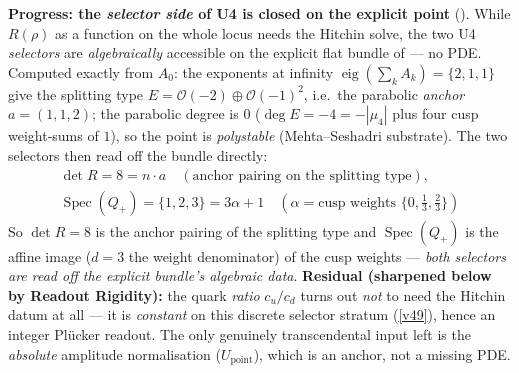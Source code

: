\documentclass[11pt,a4paper]{article}
\begin{document}
\par\smallskip\noindent\textbf{Progress: the \emph{selector side} of U4 is closed on the explicit point} (\mE).
While $R(\rho)$ as a function on the whole locus needs the Hitchin solve, the two U4 \emph{selectors} are
\emph{algebraically} accessible on the explicit flat bundle of  --- no
PDE. Computed exactly from $A_0$: the exponents at infinity $\operatorname{eig}(\sum_kA_k)=\{2,1,1\}$ give
the splitting type $E=\mathcal O(-2)\oplus\mathcal O(-1)^2$, i.e.\ the parabolic \emph{anchor} $a=(1,1,2)$;
the parabolic degree is $0$ ($\deg E=-4=-|\mu_4|$ plus four cusp weight-sums of $1$), so the point is
\emph{polystable} (Mehta--Seshadri substrate). The two selectors then read off the bundle directly:
\[
  \boxed{\ \begin{gathered}
  \det R=8=n\!\cdot\!a\quad(\text{anchor pairing on the splitting type}),\\[2pt]
  \operatorname{Spec}(Q_+)=\{1,2,3\}=3\alpha+1\quad(\alpha=\text{cusp weights }\{0,\tfrac13,\tfrac23\})
  \end{gathered}\ }
\]
So $\det R=8$ is the anchor pairing of the splitting type and $\operatorname{Spec}(Q_+)$ is the affine image
($d{=}3$ the weight denominator) of the cusp weights --- \emph{both selectors are read off the explicit
bundle's algebraic data}. \textbf{Residual (sharpened below by Readout Rigidity):} the quark \emph{ratio}
$c_u/c_d$ turns out \emph{not} to need the Hitchin datum at all --- it is \emph{constant} on this discrete
selector stratum (\vref{v49}), hence an integer Pl\"ucker readout. The only genuinely transcendental input left is
the \emph{absolute} amplitude normalisation ($U_{\mathrm{point}}$), which is an anchor, not a missing PDE.
\end{document}
